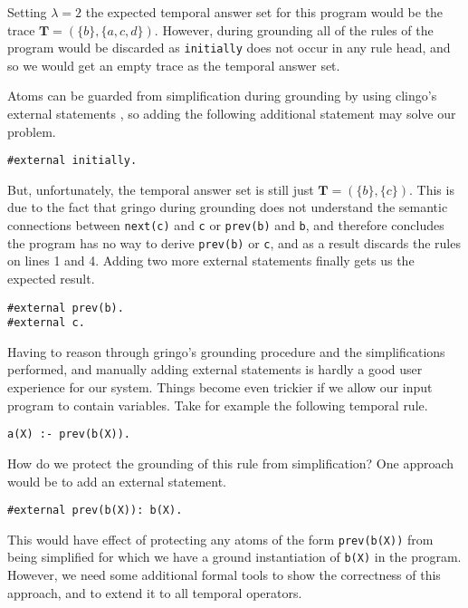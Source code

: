 Setting $\lambda=2$ the expected temporal answer set for this program
would be the trace $\bm{T}=(\{ b \},\{ a, c, d \})$. However, during
grounding all of the rules of the program would be discarded as
\verb|initially| does not occur in any rule head, and so we would get
an empty trace as the temporal answer set.

Atoms can be guarded from simplification during grounding by using
clingo's external statements \cite{PotasscoUserGuide19}, so adding the
following additional statement may solve our problem.

\begin{lstlisting}[language=clingo,numbers=none]
#external initially.
\end{lstlisting}

But, unfortunately, the temporal answer set is still just
$\bm{T}=(\{ b \},\{ c \})$. This is due to the fact that gringo during
grounding does not understand the semantic connections between
\verb|next(c)| and \verb|c| or \verb|prev(b)| and \verb|b|, and
therefore concludes the program has no way to derive \verb|prev(b)| or
\verb|c|, and as a result discards the rules on lines 1 and 4. Adding
two more external statements finally gets us the expected result.

\begin{lstlisting}[language=clingo,numbers=none]
#external prev(b).
#external c.
\end{lstlisting}

Having to reason through gringo's grounding procedure and the
simplifications performed, and manually adding external statements is
hardly a good user experience for our system.  Things become even
trickier if we allow our input program to contain variables. Take for
example the following temporal rule.

\begin{lstlisting}[language=clingo,numbers=none]
a(X) :- prev(b(X)).
\end{lstlisting}

How do we protect the grounding of this rule from simplification? One
approach would be to add an external statement.

\begin{lstlisting}[language=clingo,numbers=none]
#external prev(b(X)): b(X).
\end{lstlisting}

This would have effect of protecting any atoms of the form
\verb|prev(b(X))| from being simplified for which we have a ground
instantiation of \verb|b(X)| in the program. However, we need some
additional formal tools to show the correctness of this approach, and
to extend it to all temporal operators.


